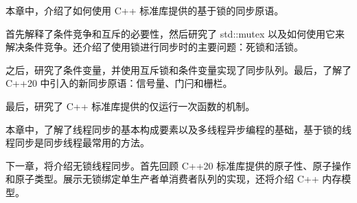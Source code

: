 本章中，介绍了如何使用 C++ 标准库提供的基于锁的同步原语。

首先解释了条件竞争和互斥的必要性，然后研究了 std::mutex 以及如何使用它来解决条件竞争。还介绍了使用锁进行同步时的主要问题：死锁和活锁。

之后，研究了条件变量，并使用互斥锁和条件变量实现了同步队列。最后，了解了 C++20 中引入的新同步原语：信号量、门闩和栅栏。

最后，研究了 C++ 标准库提供的仅运行一次函数的机制。

本章中，了解了线程同步的基本构成要素以及多线程异步编程的基础，基于锁的线程同步是同步线程最常用的方法。

下一章，将介绍无锁线程同步。首先回顾 C++20 标准库提供的原子性、原子操作和原子类型。展示无锁绑定单生产者单消费者队列的实现，还将介绍 C++ 内存模型。